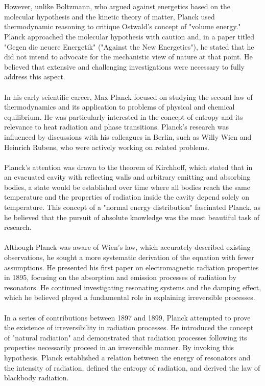 \documentclass[9pt,a4paper, twocolumn]{article}
\newcounter{theo}
\begin{document}
            \\
            \\
            However, unlike Boltzmann, who argued against energetics based on the molecular hypothesis and the kinetic theory of matter, Planck used thermodynamic reasoning to critique Ostwald's concept of "volume energy." Planck approached the molecular hypothesis with caution and, in a paper titled "Gegen die neuere Energetik" ("Against the New Energetics"), he stated that he did not intend to advocate for the mechanistic view of nature at that point. He believed that extensive and challenging investigations were necessary to fully address this aspect.
            \\
            \\
            In his early scientific career, Max Planck focused on studying the second law of thermodynamics and its application to problems of physical and chemical equilibrium. He was particularly interested in the concept of entropy and its relevance to heat radiation and phase transitions. Planck's research was influenced by discussions with his colleagues in Berlin, such as Willy Wien and Heinrich Rubens, who were actively working on related problems.
            \\
            \\
            Planck's attention was drawn to the theorem of Kirchhoff, which stated that in an evacuated cavity with reflecting walls and arbitrary emitting and absorbing bodies, a state would be established over time where all bodies reach the same temperature and the properties of radiation inside the cavity depend solely on temperature. This concept of a "normal energy distribution" fascinated Planck, as he believed that the pursuit of absolute knowledge was the most beautiful task of research.
            \\
            \\
            Although Planck was aware of Wien's law, which accurately described existing observations, he sought a more systematic derivation of the equation with fewer assumptions. He presented his first paper on electromagnetic radiation properties in 1895, focusing on the absorption and emission processes of radiation by resonators. He continued investigating resonating systems and the damping effect, which he believed played a fundamental role in explaining irreversible processes.
            \\
            \\
            In a series of contributions between 1897 and 1899, Planck attempted to prove the existence of irreversibility in radiation processes. He introduced the concept of "natural radiation" and demonstrated that radiation processes following its properties necessarily proceed in an irreversible manner. By invoking this hypothesis, Planck established a relation between the energy of resonators and the intensity of radiation, defined the entropy of radiation, and derived the law of blackbody radiation.
\end{document}

